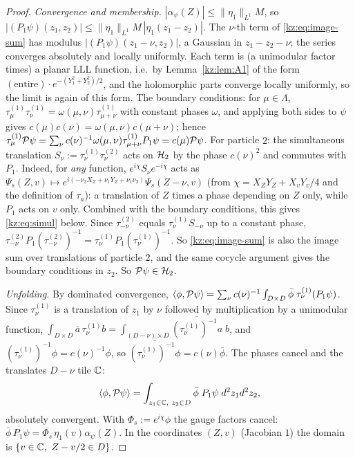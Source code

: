\begin{proof}
\emph{Convergence and membership.} $|\alpha_\psi(Z)|\le\|\eta_1\|_{L^1}M$, so
$|(P_1\psi)(z_1,z_2)|\le\|\eta_1\|_{L^1}M\,|\eta_1(z_1-z_2)|$. The $\nu$-th term of \eqref{kz:eq:image-sum}
has modulus $|(P_1\psi)(z_1-\nu,z_2)|$, a Gaussian in $z_1-z_2-\nu$; the series converges absolutely and
locally uniformly. Each term is (a unimodular factor times) a planar LLL function, i.e.\ by
Lemma~\ref{kz:lem:A1} of the form $(\text{entire})\cdot e^{-(Y_1^2+Y_2^2)/2}$, and the holomorphic parts
converge locally uniformly, so the limit is again of this form. The boundary conditions: for
$\mu\in\Lambda$, $\tau^{(1)}_\mu\tau^{(1)}_\nu=\omega(\mu,\nu)\tau^{(1)}_{\mu+\nu}$ with constant phases
$\omega$, and applying both sides to $\psi$ gives $c(\mu)c(\nu)=\omega(\mu,\nu)c(\mu+\nu)$; hence
$\tau^{(1)}_\mu\mathcal{P}\psi=\sum_\nu c(\nu)^{-1}\omega(\mu,\nu)\tau^{(1)}_{\mu+\nu}P_1\psi=c(\mu)\mathcal{P}\psi$. For
particle $2$: the simultaneous translation $S_\nu:=\tau^{(1)}_\nu\tau^{(2)}_\nu$ acts on $\mathcal{H}_2$ by the
phase $c(\nu)^2$ and commutes with $P_1$. Indeed, for \emph{any} function,
$e^{i\chi}S_\nu e^{-i\chi}$ acts as $\Psi_s(Z,v)\mapsto e^{i(-\nu_2X_Z+\nu_1Y_Z+\nu_1\nu_2)}\Psi_s(Z-\nu,v)$ (from
$\chi=X_ZY_Z+X_vY_v/4$ and the definition of $\tau_a$): a translation of $Z$ times a phase depending on $Z$
only, while $P_1$ acts on $v$ only. Combined with the boundary conditions, this gives \eqref{kz:eq:simul} below.
Since $\tau^{(2)}_{-\nu}$ equals $\tau^{(1)}_\nu S_{-\nu}$ up to a constant phase,
$\tau^{(2)}_{-\nu}P_1(\tau^{(2)}_{-\nu})^{-1}=\tau^{(1)}_\nu P_1(\tau^{(1)}_\nu)^{-1}$. So \eqref{kz:eq:image-sum} is also
the image sum over translations of particle $2$, and the same cocycle argument gives the boundary
conditions in $z_2$. So $\mathcal{P}\psi\in\mathcal{H}_2$.

\emph{Unfolding.} By dominated convergence,
$\langle\phi,\mathcal{P}\psi\rangle=\sum_\nu c(\nu)^{-1}\int_{D\times D}\bar\phi\;\tau^{(1)}_\nu(P_1\psi)$. Since
$\tau^{(1)}_\nu$ is a translation of $z_1$ by $\nu$ followed by multiplication by a unimodular
function, $\int_{D\times D}\bar a\,\tau^{(1)}_\nu b=\int_{(D-\nu)\times D}\overline{(\tau^{(1)}_\nu)^{-1}a}\;b$,
and $(\tau^{(1)}_\nu)^{-1}\phi=c(\nu)^{-1}\phi$, so $\overline{(\tau^{(1)}_\nu)^{-1}\phi}=c(\nu)\bar\phi$.
The phases cancel and the translates $D-\nu$ tile $\mathbb{C}$:
\[
\langle\phi,\kzP\psi\rangle=\int_{z_1\in\C,\ z_2\in D}\bar\phi\;P_1\psi\;d^2z_1d^2z_2,
\]
absolutely convergent. With $\Phi_s:=e^{i\chi}\phi$ the gauge factors cancel:
$\bar\phi\,P_1\psi=\overline{\Phi_s}\,\eta_1(v)\alpha_\psi(Z)$. In the coordinates $(Z,v)$ (Jacobian $1$) the domain is
$\{v\in\mathbb{C},\ Z-v/2\in D\}$.


\end{proof}
